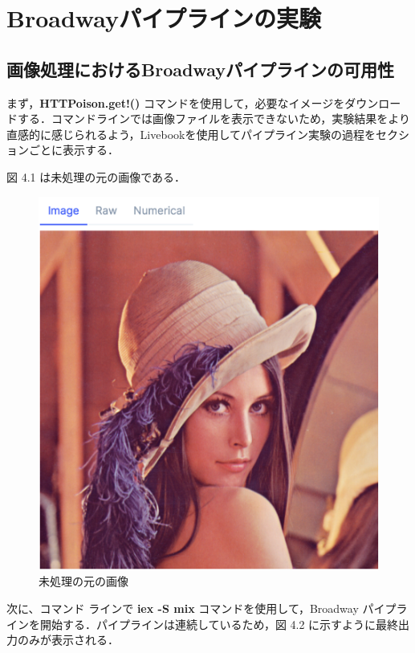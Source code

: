 \documentclass[a4paper]{jreport}	%
\begin{document}
\section{Broadwayパイプラインの実験}

\subsection{画像処理におけるBroadwayパイプラインの可用性} 
まず，\textbf{HTTPoison.get!() }コマンドを使用して，必要なイメージをダウンロードする．コマンドラインでは画像ファイルを表示できないため，実験結果をより直感的に感じられるよう，Livebookを使用してパイプライン実験の過程をセクションごとに表示する．

図 4.1 は未処理の元の画像である．
\begin{figure}[H]
\vspace{8.5cm}
\begin{center}
\hspace{-8cm}
\includegraphics[scale=0.5]{ja/f3.png}
\end{center}
\caption{未処理の元の画像}
\end{figure}

次に、コマンド ラインで \textbf{iex -S mix} コマンドを使用して，Broadway パイプラインを開始する．パイプラインは連続しているため，図 4.2 に示すように最終出力のみが表示される．
\end{document}
